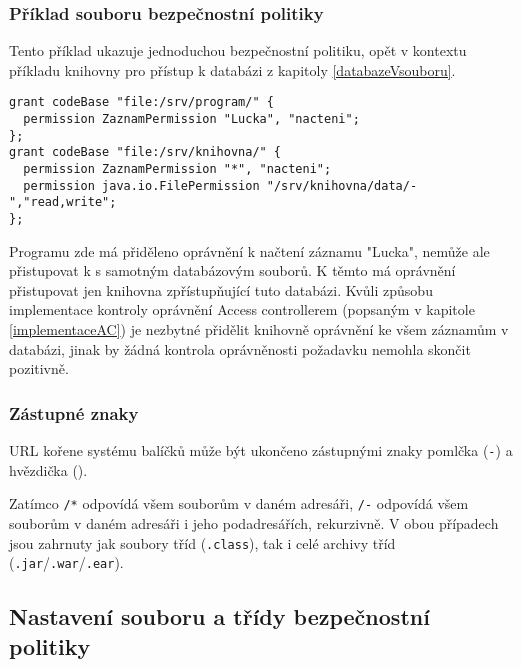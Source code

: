 \subsubsection{Příklad souboru bezpečnostní politiky}

Tento příklad ukazuje jednoduchou bezpečnostní politiku, opět v kontextu příkladu knihovny pro přístup k databázi z kapitoly \ref{databazeVsouboru}.

\begin{verbatim}
grant codeBase "file:/srv/program/" {
  permission ZaznamPermission "Lucka", "nacteni";
};
grant codeBase "file:/srv/knihovna/" {
  permission ZaznamPermission "*", "nacteni";
  permission java.io.FilePermission "/srv/knihovna/data/-","read,write";
};
\end{verbatim}

Programu zde má přiděleno oprávnění k načtení záznamu "Lucka", nemůže ale přistupovat k s samotným databázovým souborů. K těmto má oprávnění přistupovat jen knihovna zpřístupňující tuto databázi. Kvůli způsobu implementace kontroly oprávnění Access controllerem (popsaným v kapitole \ref{implementaceAC}) je nezbytné přidělit knihovně oprávnění ke všem záznamům v databázi, jinak by žádná kontrola oprávněnosti požadavku nemohla skončit pozitivně.

\subsubsection{Zástupné znaky}

URL kořene systému balíčků může být ukončeno zástupnými znaky pomlčka ({\tt -}) a hvězdička ({\tt *}).

Zatímco {\tt /*} odpovídá všem souborům v daném adresáři, {\tt /-} odpovídá všem souborům v daném adresáři i jeho podadresářích, rekurzivně. V obou případech jsou zahrnuty jak soubory tříd ({\tt .class}), tak i celé archivy tříd ({\tt .jar}/{\tt .war}/{\tt .ear}).
\cite{jdkdocPolicyFiles}

\subsection{Nastavení souboru a třídy bezpečnostní politiky}

